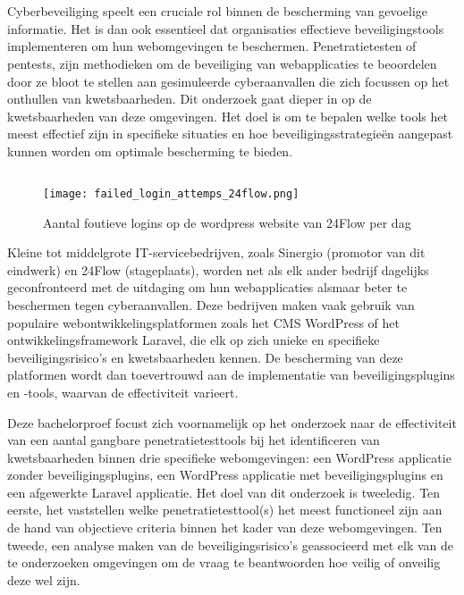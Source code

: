 
\chapter{}%
\label{ch:inleiding}
Cyberbeveiliging speelt een cruciale rol binnen de bescherming van gevoelige informatie. Het is dan ook essentieel dat organisaties 
effectieve beveiligingstools implementeren om hun webomgevingen te beschermen. Penetratietesten of pentests, zijn  
methodieken om de beveiliging van webapplicaties te beoordelen door ze bloot te stellen aan gesimuleerde 
cyberaanvallen die zich focussen op het onthullen van kwetsbaarheden. Dit onderzoek gaat dieper in op de kwetsbaarheden van deze omgevingen. Het doel is om te bepalen welke tools 
het meest effectief zijn in specifieke situaties en hoe beveiligingsstrategieën aangepast kunnen worden om optimale 
bescherming te bieden.


\section{}%
\label{sec:probleemstelling}

\begin{figure}
  \centering
  \texttt{[image: failed\_login\_attemps\_24flow.png]}
  \caption[Aantal foutieve logins op de wordpress website van 24Flow per dag ]{Aantal foutieve logins op de wordpress website van 24Flow per dag }
\end{figure}
Kleine tot middelgrote IT-servicebedrijven, zoals Sinergio (promotor van dit eindwerk) en 24Flow (stageplaats), worden net 
als elk ander bedrijf dagelijks geconfronteerd met de uitdaging om hun 
webapplicaties alsmaar beter te beschermen tegen cyberaanvallen. Deze bedrijven maken vaak gebruik van populaire webontwikkelingsplatformen 
zoals het CMS WordPress of het ontwikkelingsframework Laravel, die elk op zich unieke en specifieke beveiligingsrisico's en 
kwetsbaarheden kennen. De bescherming van deze platformen wordt dan toevertrouwd aan de implementatie van beveiligingsplugins 
en -tools, waarvan de effectiviteit varieert.

Deze bachelorproef focust zich voornamelijk op het onderzoek naar de effectiviteit van een aantal gangbare penetratietesttools  
bij het identificeren van kwetsbaarheden binnen drie specifieke webomgevingen: een WordPress applicatie zonder beveiligingsplugins,
een WordPress applicatie met beveiligingsplugins en een afgewerkte Laravel applicatie. Het doel van dit onderzoek is tweeledig. 
Ten eerste, het vaststellen welke penetratietesttool(s) het meest functioneel zijn aan de hand van objectieve criteria binnen het kader van deze webomgevingen. Ten tweede, 
een analyse maken van de beveiligingsrisico's geassocieerd met elk van de te onderzoeken omgevingen om de vraag te beantwoorden hoe 
veilig of onveilig deze wel zijn.

